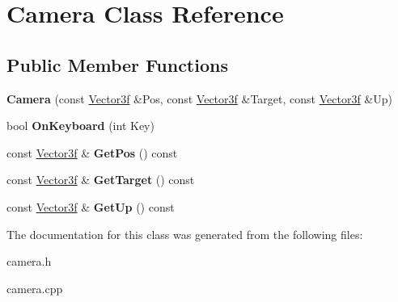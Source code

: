 \hypertarget{classCamera}{\section{Camera Class Reference}
\label{classCamera}
}
\subsection*{Public Member Functions}
\begin{DoxyCompactItemize}
\item 
\hypertarget{classCamera_a21ebfdad71ca67ec496f16b50e013d21}{{\bfseries Camera} (const \hyperlink{structVector3f}{Vector3f} \&Pos, const \hyperlink{structVector3f}{Vector3f} \&Target, const \hyperlink{structVector3f}{Vector3f} \&Up)}\label{classCamera_a21ebfdad71ca67ec496f16b50e013d21}

\item 
\hypertarget{classCamera_a93809e953f183cd95568e2e1a06de2b3}{bool {\bfseries On\-Keyboard} (int Key)}\label{classCamera_a93809e953f183cd95568e2e1a06de2b3}

\item 
\hypertarget{classCamera_aba5837fa7cb0cc4cc421e07cf6566cff}{const \hyperlink{structVector3f}{Vector3f} \& {\bfseries Get\-Pos} () const }\label{classCamera_aba5837fa7cb0cc4cc421e07cf6566cff}

\item 
\hypertarget{classCamera_a601ded4bbaf03c798abf646c21ff64a3}{const \hyperlink{structVector3f}{Vector3f} \& {\bfseries Get\-Target} () const }\label{classCamera_a601ded4bbaf03c798abf646c21ff64a3}

\item 
\hypertarget{classCamera_af4647e8efeeefc8158169b428091015f}{const \hyperlink{structVector3f}{Vector3f} \& {\bfseries Get\-Up} () const }\label{classCamera_af4647e8efeeefc8158169b428091015f}

\end{DoxyCompactItemize}


The documentation for this class was generated from the following files\-:\begin{DoxyCompactItemize}
\item 
camera.\-h\item 
camera.\-cpp\end{DoxyCompactItemize}
